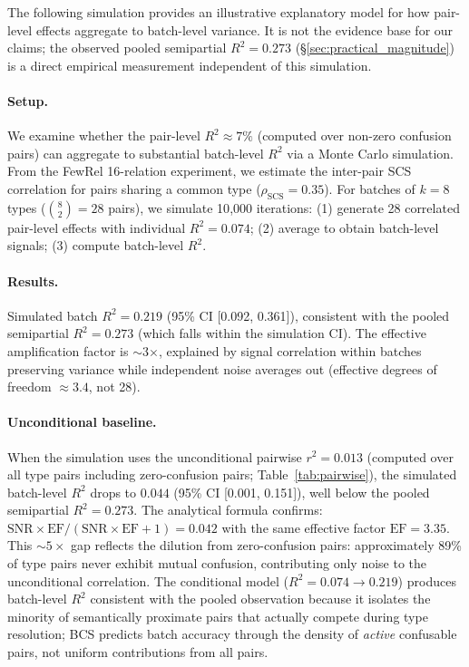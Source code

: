 \documentclass[11pt]{article}
\begin{document}
The following simulation provides an illustrative explanatory model for how pair-level effects aggregate to batch-level variance. It is not the evidence base for our claims; the observed pooled semipartial $R^2 = 0.273$ (\S\ref{sec:practical_magnitude}) is a direct empirical measurement independent of this simulation.

\paragraph{Setup.} We examine whether the pair-level $R^2 \approx 7\%$ (computed over non-zero confusion pairs) can aggregate to substantial batch-level $R^2$ via a Monte Carlo simulation. From the FewRel 16-relation experiment, we estimate the inter-pair SCS correlation for pairs sharing a common type ($\rho_\text{SCS} = 0.35$). For batches of $k=8$ types ($\binom{8}{2}=28$ pairs), we simulate 10{,}000 iterations: (1) generate 28 correlated pair-level effects with individual $R^2 = 0.074$; (2) average to obtain batch-level signals; (3) compute batch-level $R^2$.

\paragraph{Results.} Simulated batch $R^2 = 0.219$ (95\% CI [0.092, 0.361]), consistent with the pooled semipartial $R^2 = 0.273$ (which falls within the simulation CI). The effective amplification factor is $\sim$3$\times$, explained by signal correlation within batches preserving variance while independent noise averages out (effective degrees of freedom $\approx 3.4$, not 28).

\paragraph{Unconditional baseline.}
When the simulation uses the unconditional pairwise $r^2 = 0.013$ (computed over all type pairs including zero-confusion pairs; Table~\ref{tab:pairwise}), the simulated batch-level $R^2$ drops to $0.044$ (95\% CI [0.001, 0.151]), well below the pooled semipartial $R^2 = 0.273$. The analytical formula confirms: $\text{SNR} \times \text{EF} / (\text{SNR} \times \text{EF} + 1) = 0.042$ with the same effective factor $\text{EF} = 3.35$. This ${\sim}5\times$ gap reflects the dilution from zero-confusion pairs: approximately 89\% of type pairs never exhibit mutual confusion, contributing only noise to the unconditional correlation. The conditional model ($R^2 = 0.074 \to 0.219$) produces batch-level $R^2$ consistent with the pooled observation because it isolates the minority of semantically proximate pairs that actually compete during type resolution; BCS predicts batch accuracy through the density of \emph{active} confusable pairs, not uniform contributions from all pairs.
\end{document}
